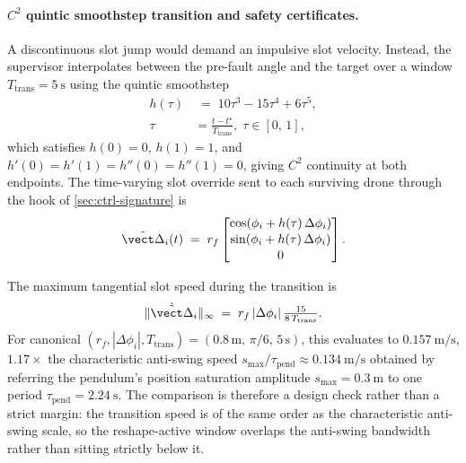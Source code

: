 \paragraph{$C^2$ quintic smoothstep transition and safety certificates.} A discontinuous slot jump would demand an impulsive slot velocity. Instead, the supervisor interpolates between the pre-fault angle and the target over a window $T_{\mathrm{trans}} = \SI{5}{\second}$ using the quintic smoothstep
\begin{align}
\label{eq:smoothstep-quintic}
  h(\tau) &\;=\; 10\tau^3 - 15\tau^4 + 6\tau^5,\\
  \tau &= \frac{t - t^\star}{T_{\mathrm{trans}}},\;
  \tau \in [0,\,1],\nonumber
\end{align}
which satisfies $h(0) = 0$, $h(1) = 1$, and $h'(0) = h'(1) = h''(0) = h''(1) = 0$, giving $C^2$ continuity at both endpoints. The time-varying slot override sent to each surviving drone through the hook of \cref{sec:ctrl-signature} is
\begin{equation}
  \tilde{\vect\Delta}_i(t)
    \;=\; r_f
    \begin{bmatrix}
      \cos(\phi_i + h(\tau)\,\Delta\phi_i) \\[1pt]
      \sin(\phi_i + h(\tau)\,\Delta\phi_i) \\[1pt]
      0
    \end{bmatrix}.
  \label{eq:dyn-offset}
\end{equation}

\begin{proposition}
\label{prop:peak-slot}
The maximum tangential slot speed during the transition is
\begin{equation}
  \|\dot{\tilde{\vect\Delta}}_i\|_\infty
    \;=\; r_f\,|\Delta\phi_i|\,
          \tfrac{15}{8\,T_{\mathrm{trans}}}.
\end{equation}
For canonical $(r_f, |\Delta\phi_i|, T_{\mathrm{trans}}) = (0.8\,\mathrm{m},\, \pi/6,\, 5\,\mathrm{s})$, this evaluates to $\SI{0.157}{\metre\per\second}$, $1.17\times$ the characteristic anti-swing speed $s_{\max}/\tau_{\mathrm{pend}} \approx \SI{0.134}{\metre\per\second}$ obtained by referring the pendulum's position saturation amplitude $s_{\max} = \SI{0.3}{\metre}$ to one period $\tau_{\mathrm{pend}} = \SI{2.24}{\second}$. The comparison is therefore a design check rather than a strict margin: the transition speed is of the same order as the characteristic anti-swing scale, so the reshape-active window overlaps the anti-swing bandwidth rather than sitting strictly below it.
\end{proposition}

